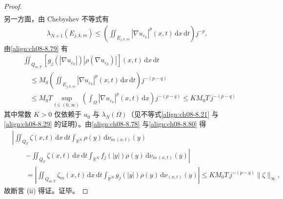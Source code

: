 \documentclass[../../main.tex]{subfiles}%
\begin{document}
\begin{proof}
\begin{align}
\end{align}
另一方面，由 Chebyshev 不等式有
\begin{align*}
\lambda_{N+1}(E_{j,k,m})\leqslant\left(\iint_{E_{j,k,m}}|\nabla u_{\varepsilon_k}|^p(x,t)\,\mathrm{d}x\,\mathrm{d}t\right)j^{-p}.
\end{align*}
由\eqref{align:ch08-8.79} 有
\begin{align}
&\iint_{Q_{m,T}}[g_j(|\nabla u_{\varepsilon_k}|)|\rho(\nabla u_{\varepsilon_k})|](x,t)\,\mathrm{d}x\,\mathrm{d}t\nonumber\\
&\quad\leqslant M_0\left(\iint_{E_{j,k,m}}|\nabla u_{\varepsilon_k}|^p(x,t)\,\mathrm{d}x\,\mathrm{d}t\right)j^{-(p-q)}\nonumber\\
&\quad\leqslant M_0T\sup_{t\in(0,\infty)}\left(\int_\Omega|\nabla u_{\varepsilon_k}|^p(x,t)\,\mathrm{d}x\right)j^{-(p-q)}
\leqslant KM_0T\,j^{-(p-q)} \label{align:ch08-8.80}
\end{align}
其中常数 $K>0$ 仅依赖于 $u_0$ 与 $\lambda_N(\Omega)$（见不等式\eqref{align:ch08-8.21} 与\eqref{align:ch08-8.29} 的证明）。由\eqref{align:ch08-8.78} 与\eqref{align:ch08-8.80} 得
\begin{align*}
&\left|\iint_{Q_T}\zeta(x,t)\,\mathrm{d}x\,\mathrm{d}t\int_{\mathbb{R}^N}\rho(y)\,\mathrm{d}\nu_{m\,(x,t)}(y)\right.\\
&\qquad\left.-\iint_{Q_T}\zeta(x,t)\,\mathrm{d}x\,\mathrm{d}t\int_{\mathbb{R}^N}f_j(|y|)\rho(y)\,\mathrm{d}\nu_{m\,(x,t)}(y)\right|\\
&\qquad=\left|\iint_{Q_{m,T}}\zeta_m(x,t)\,\mathrm{d}x\,\mathrm{d}t\int_{\mathbb{R}^N}g_j(|y|)\rho(y)\,\mathrm{d}\nu_{(x,t)}(y)\right|
\leqslant KM_0T\,j^{-(p-q)}\|\zeta\|_\infty,
\end{align*}
故断言 (ii) 得证。证毕。
\end{proof}
\end{document}
